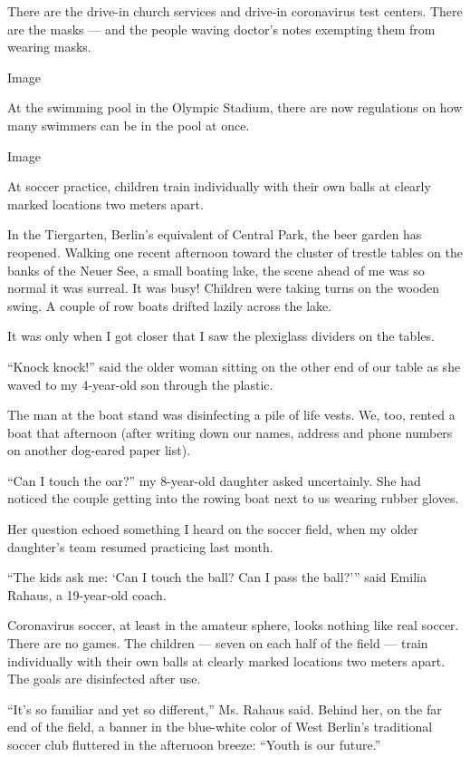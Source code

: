 There are the drive-in church services and drive-in coronavirus test
centers. There are the masks --- and the people waving doctor's notes
exempting them from wearing masks.

Image

At the swimming pool in the Olympic Stadium, there are now regulations
on how many swimmers can be in the pool at once.

Image

 At soccer practice, children train individually with their own balls at
clearly marked locations two meters apart.

In the Tiergarten, Berlin's equivalent of Central Park, the beer garden
has reopened. Walking one recent afternoon toward the cluster of trestle
tables on the banks of the Neuer See, a small boating lake, the scene
ahead of me was so normal it was surreal. It was busy! Children were
taking turns on the wooden swing. A couple of row boats drifted lazily
across the lake.

It was only when I got closer that I saw the plexiglass dividers on the
tables.

``Knock knock!'' said the older woman sitting on the other end of our
table as she waved to my 4-year-old son through the plastic.

The man at the boat stand was disinfecting a pile of life vests. We,
too, rented a boat that afternoon (after writing down our names, address
and phone numbers on another dog-eared paper list).

``Can I touch the oar?'' my 8-year-old daughter asked uncertainly. She
had noticed the couple getting into the rowing boat next to us wearing
rubber gloves.

Her question echoed something I heard on the soccer field, when my older
daughter's team resumed practicing last month.

``The kids ask me: `Can I touch the ball? Can I pass the ball?''' said
Emilia Rahaus, a 19-year-old coach.

Coronavirus soccer, at least in the amateur sphere, looks nothing like
real soccer. There are no games. The children --- seven on each half of
the field --- train individually with their own balls at clearly marked
locations two meters apart. The goals are disinfected after use.

``It's so familiar and yet so different,'' Ms. Rahaus said. Behind her,
on the far end of the field, a banner in the blue-white color of West
Berlin's traditional soccer club fluttered in the afternoon breeze:
``Youth is our future.''

